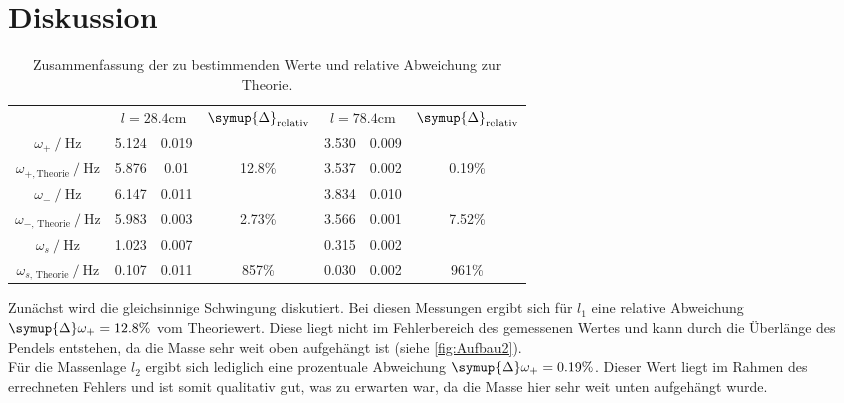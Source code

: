 \section{Diskussion}
\label{sec:Diskussion}
\begin{table}
    \centering
    \caption{Zusammenfassung der zu bestimmenden Werte und relative Abweichung zur Theorie.}
    \begin{tabular}{c S @{${}\pm{}$} S c S[table-format=2.3] @{${}\pm{}$} S[table-format=1.3] c}
    \toprule
    &  &  &  & \\
    \cmidrule(lr){2-3}\cmidrule(lr){4-4}\cmidrule(lr){5-6}\cmidrule(lr){7-7}
    {$\omega_+ \mathbin{/} \unit{\hertz}$}                     & 5.124 & 0.019 &  & 3.530 & 0.009 & \\
    {$\omega_{+,\text{Theorie}} \mathbin{/} \unit{\hertz}$}    & 5.876 & 0.01 & 12.8\% & 3.537 & 0.002 & 0.19\% \\
    {$\omega_- \mathbin{/} \unit{\hertz}$}                     & 6.147 & 0.011 & & 3.834 & 0.010 & \\
    {$\omega_{{-}\text{, Theorie}} \mathbin{/} \unit{\hertz}$} & 5.983 & 0.003 & 2.73\% & 3.566 & 0.001 & 7.52\% \\
    {$\omega_s \mathbin{/} \unit{\hertz}$}                     & 1.023 & 0.007 & & 0.315 & 0.002 & \\
    {$\omega_{{s}\text{, Theorie}} \mathbin{/} \unit{\hertz}$} & 0.107 & 0.011 & 857\% & 0.030 & 0.002 & 961\% \\
    \bottomrule
    \end{tabular}
\end{table}


Zunächst wird die gleichsinnige Schwingung diskutiert. Bei diesen Messungen ergibt sich für $l_1$ eine relative Abweichung 
$\symup{\Delta}\omega_{+} = 12.8\%$ vom Theoriewert. Diese liegt nicht im Fehlerbereich des gemessenen Wertes und kann durch die Überlänge des Pendels entstehen, da die Masse sehr
weit oben aufgehängt ist (siehe \autoref{fig:Aufbau2}).\\ Für die Massenlage $l_2$ ergibt sich lediglich eine prozentuale Abweichung $\symup{\Delta}\omega_{+} = 0.19\%$. Dieser Wert
liegt im Rahmen des errechneten Fehlers und ist somit qualitativ gut, was zu erwarten war, da die Masse hier sehr weit unten aufgehängt wurde.


